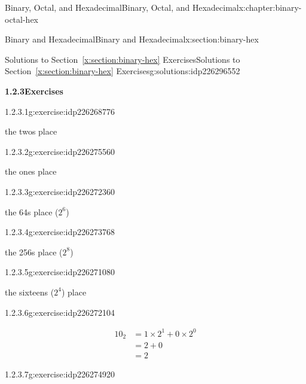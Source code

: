 \documentclass[twoside,10pt,]{book}
\newcommand{\xreffont}{\relax}
\numberwithin{equation}{section}
\newcommand{\amp}{&}
\begin{document}
\begin{chapterptx}{Binary, Octal, and Hexadecimal}{}{Binary, Octal, and Hexadecimal}{}{}{x:chapter:binary-octal-hex}
\begin{sectionptx}{Binary and Hexadecimal}{}{Binary and Hexadecimal}{}{}{x:section:binary-hex}
\begin{solutions-subsection}{Solutions to Section~{\xreffont\ref*{x:section:binary-hex}} Exercises}{}{Solutions to Section~{\xreffont\ref*{x:section:binary-hex}} Exercises}{}{}{g:solutions:idp226296552}
\par\medskip
\noindent\textbf{\normalsize{}1.2.3\space\textperiodcentered\space{}Exercises}
\begin{exercisegroup}
\begin{divisionsolutioneg}{1.2.3.1}{}{g:exercise:idp226268776}%
\par\smallskip%
\noindent\hypertarget{g:solution:idp226269928-main}{}the twos place\end{divisionsolutioneg}%
\begin{divisionsolutioneg}{1.2.3.2}{}{g:exercise:idp226275560}%
\par\smallskip%
\noindent\hypertarget{g:solution:idp226274536-main}{}the ones place\end{divisionsolutioneg}%
\begin{divisionsolutioneg}{1.2.3.3}{}{g:exercise:idp226272360}%
\par\smallskip%
\noindent\hypertarget{g:solution:idp226275304-main}{}the 64s place (\(2^6\))\end{divisionsolutioneg}%
\begin{divisionsolutioneg}{1.2.3.4}{}{g:exercise:idp226273768}%
\par\smallskip%
\noindent\hypertarget{g:solution:idp226269672-main}{}the 256s place (\(2^8\))\end{divisionsolutioneg}%
\begin{divisionsolutioneg}{1.2.3.5}{}{g:exercise:idp226271080}%
\par\smallskip%
\noindent\hypertarget{g:solution:idp226271336-main}{}the sixteens (\(2^4\)) place\end{divisionsolutioneg}%
\end{exercisegroup}
\par\medskip\noindent
\begin{exercisegroup}
\begin{divisionsolutioneg}{1.2.3.6}{}{g:exercise:idp226272104}%
\par\smallskip%
\noindent\hypertarget{g:solution:idp226276200-main}{}%
\begin{align*}
10_2 \amp = 1\times2^1+0\times2^0\\
\amp = 2 + 0\\
\amp = 2
\end{align*}
\end{divisionsolutioneg}%
\begin{divisionsolutioneg}{1.2.3.7}{}{g:exercise:idp226274920}%
\par\smallskip%
\noindent\hypertarget{g:solution:idp226275944-main}{}%

\end{divisionsolutioneg}
\end{exercisegroup}
\end{solutions-subsection}
\end{sectionptx}
\end{chapterptx}
\end{document}
